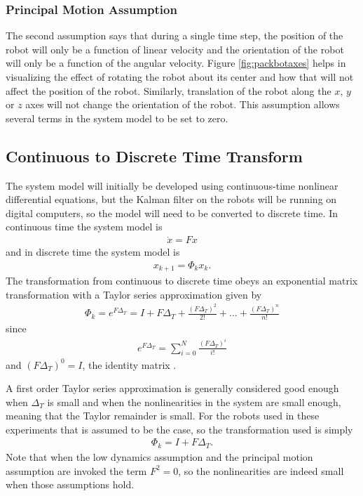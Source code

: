 \subsubsection{Principal Motion Assumption}
\label{sec:kfPrincipalMotionAssumption}
The second assumption says that during a single time step, the position of the robot will only be a function of linear velocity and the orientation of the robot will only be a function of the angular velocity. Figure \ref{fig:packbotaxes} helps in visualizing the effect of rotating the robot about its center and how that will not affect the position of the robot. Similarly, translation of the robot along the $x$, $y$ or $z$ axes will not change the orientation of the robot. This assumption allows several terms in the system model to be set to zero.

\subsection{Continuous to Discrete Time Transform}
\label{sec:kfContToDiscTransform}
The system model will initially be developed using continuous-time nonlinear differential equations, but the Kalman filter on the robots will be running on digital computers, so the model will need to be converted to discrete time. In continuous time the system model is 
\begin{align*}
\dot{x} = Fx
\end{align*}
and in discrete time the system model is
\begin{align*}
x_{k+1} = \Phi_k x_k.
\end{align*}
The transformation from continuous to discrete time obeys an exponential matrix transformation with a Taylor series approximation given by \cite{Gelb74}
\begin{align*}
\Phi_k = e^{F\Delta_T} = I + F\Delta_T + \frac{(F\Delta_T)^2}{2!} + \ldots + \frac{(F\Delta_T)^n}{n!}
\end{align*}
since
\begin{align*}
e^{F\Delta_T} = \sum_{i=0}^N \frac{(F\Delta_T)^i}{i!}
\end{align*}
and $(F\Delta_T)^0=I$, the identity matrix \cite{Phadke99}.

A first order Taylor series approximation is generally considered good enough when $\Delta_T$ is small and when the nonlinearities in the system are small enough, meaning that the Taylor remainder is small. For the robots used in these experiments that is assumed to be the case, so the transformation used is simply
\begin{align}
\label{eq:kfContToDiscTransform}
\Phi_k = I + F\Delta_T.
\end{align}
Note that when the low dynamics assumption and the principal motion assumption are invoked the term $F^2=0$, so the nonlinearities are indeed small when those assumptions hold.

